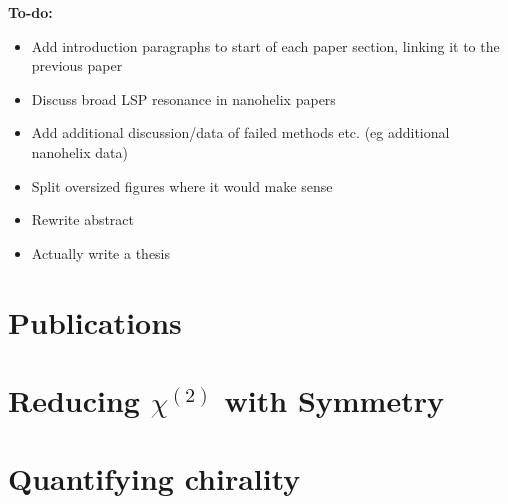 \documentclass[11pt,a4paper,final]{report}
\begin{document}
\clearpage

\noindent\textbf{To-do:}
\begin{itemize}
	\item Add introduction paragraphs to start of each paper section, linking it to the previous paper
	\item Discuss broad LSP resonance in nanohelix papers
	\item Add additional discussion/data of failed methods etc. (eg additional nanohelix data)
	\item Split oversized figures where it would make sense
	\item Rewrite abstract
    \item Actually write a thesis
\end{itemize}
\color{black}

\chapter*{Publications}


\bigskip \noindent {}

\bigskip \noindent {}

\bigskip \noindent {}

\bigskip \noindent {}


%










%


\clearpage

\appendix
\chapter{Reducing \texorpdfstring{$\chi^{(2)}$}{Lg} with Symmetry}\label{sec:appendix:rotations}

\chapter{Quantifying chirality}\label{sec:appendix:QuantifyingChirality}

\end{document}
